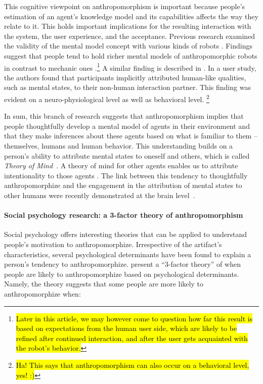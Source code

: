 \documentclass{frontiersSCNS} %
\begin{document}
This cognitive viewpoint on anthropomorphism is important because people's estimation of an agent's knowledge model and its capabilities affects the way they relate to it. This holds important implications for the resulting interaction with the system, the user experience, and the acceptance. Previous research examined the validity of the mental model concept with various kinds of robots \cite{schmitz_concepts_2011,kiesler_mental_2002}. Findings suggest that people tend to hold richer mental models of anthropomorphic robots in contrast to mechanic ones \cite{kiesler_mental_2002}.\footnote{\hl{Later in this article, we may however come to question how far this result is based on expectations from the human user side, which are likely to be refined after continued interaction, and after the user gets acquainted with the robot's behavior.}} A similar finding is described in \cite{hegel_understanding_2008}. In a user study, the authors found that participants implicitly attributed human-like qualities, such as mental states, to their non-human interaction partner. This finding was evident on a neuro-physiological level as well as behavioral level. \footnote{\hl{Ha! This says that anthropomorphism can also occur on a behavioral level, yes! :)}} 

In sum, this branch of research suggests that anthropomorphism implies that people thoughtfully develop a mental model of agents in their environment and that they make inferences about these agents based on what is familiar to them -- themselves, humans and human behavior. This understanding builds on a person's ability to attribute mental states to oneself and others, which is called \textit{Theory of Mind}~\citep{Premack1978}. A theory of mind for other agents enables us to attribute intentionality to those agents \citep{leslie_pretense_1987,admoni_multi-category_2012}. The link between this tendency to thoughtfully anthropomorphize and the engagement in the attribution of mental states to other humans were recently demonstrated at the brain level~\citep{cullen2013individual}.


\paragraph*{Social psychology research: a 3-factor theory of anthropomorphism\\}
\label{sec:psychological-factors}

Social psychology offers interesting theories that can be applied to understand people's motivation to anthropomorphize. Irrespective of the artifact's characteristics, several psychological determinants have been found to explain a person's tendency to anthropomorphize. \cite{epley_seeing_2007} present a ``3-factor theory'' of when people are likely to anthropomorphize based on psychological determinants. Namely, the theory suggests that some people are more likely to anthropomorphize when: 
\end{document}
